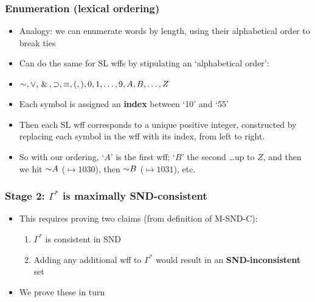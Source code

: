 \begin{frame}
\frametitle{Enumeration (lexical ordering)}

\begin{itemize}[<+->]

\item Analogy: we can enumerate words by length, using their alphabetical order to break ties %

\item Can do the same for SL wffs by stipulating an `alphabetical order':

\item $\enot, \eor, \eand, \eif, \eiff, (, ), 0, 1, \dots, 9, A, B, \dots, Z$

\item Each symbol is assigned an \textbf{index} between `10' and `55' %

\item Then each SL wff corresponds to a unique positive integer, constructed by replacing each symbol in the wff with its index, from left to right. 

\item So with our ordering, `$A$' is the first wff; `$B$' the second \dots up to $Z$, and then we hit $\enot A$ ($\mapsto 1030$), then $\enot B$ ($\mapsto 1031$), etc. 

\end{itemize}
\end{frame}

\begin{frame}
\frametitle{Stage 2: $\Gamma^{\ast}$ is maximally SND-consistent}

\begin{itemize}[<+->]

\item This requires proving two claims (from definition of M-SND-C):

\bigskip

\begin{enumerate}[1.)]

\item $\Gamma^{\ast}$ is consistent in SND

\item Adding any additional wff to $\Gamma^{\ast}$ would result in an \textbf{\textcolor{OGlyallpink}{SND-inconsistent}} set

\end{enumerate}

\bigskip

\item We prove these in turn

\end{itemize}
\end{frame}

